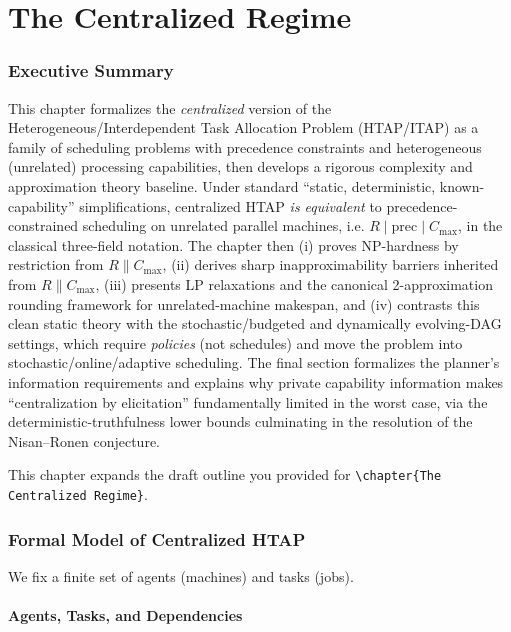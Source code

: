 \chapter{The Centralized Regime}\label{chap:centralized}

\subsection{Executive Summary}

This chapter formalizes the \emph{centralized} version of the Heterogeneous/Interdependent Task Allocation Problem (HTAP/ITAP) as a family of scheduling problems with precedence constraints and heterogeneous (unrelated) processing capabilities, then develops a rigorous complexity and approximation theory baseline. Under standard ``static, deterministic, known-capability'' simplifications, centralized HTAP \emph{is equivalent} to precedence-constrained scheduling on unrelated parallel machines, i.e. \(R\mid \mathrm{prec}\mid C_{\max}\), in the classical three-field notation. The chapter then (i) proves NP-hardness by restriction from \(R\parallel C_{\max}\), (ii) derives sharp inapproximability barriers inherited from \(R\parallel C_{\max}\), (iii) presents LP relaxations and the canonical 2-approximation rounding framework for unrelated-machine makespan, and (iv) contrasts this clean static theory with the stochastic/budgeted and dynamically evolving-DAG settings, which require \emph{policies} (not schedules) and move the problem into stochastic/online/adaptive scheduling. The final section formalizes the planner's information requirements and explains why private capability information makes ``centralization by elicitation'' fundamentally limited in the worst case, via the deterministic-truthfulness lower bounds culminating in the resolution of the Nisan--Ronen conjecture.

This chapter expands the draft outline you provided for \texttt{\textbackslash chapter\{The Centralized Regime\}}.

\subsection{Formal Model of Centralized HTAP}

We fix a finite set of agents (machines) and tasks (jobs).

\subsubsection{Agents, Tasks, and Dependencies}


